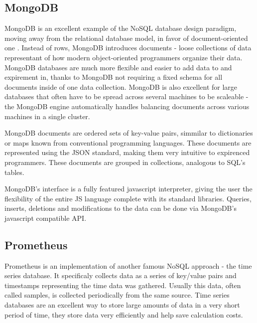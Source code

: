 \subsection{MongoDB}
\label{subsec:background:first_subsection}
MongoDB is an excellent example of the NoSQL database design paradigm, moving away from the relational database model, in favor of document-oriented one \citep{mongoDB}. Instead of rows, MongoDB introduces documents - loose collections of data representant of how modern object-oriented programmers organize their data. MongoDB databases are much more flexible and easier to add data to and expirement in, thanks to MongoDB not requiring a fixed schema for all documents inside of one data collection.
MongoDB is also excellent for large databases that often have to be spread across several machines to be scaleable - the MongoDB engine automatically handles balancing documents across various machines in a single cluster. 

MongoDB documents are ordered sets of key-value pairs, simmilar to dictionaries or maps known from conventional programming languages. These documents are represented using the JSON standard, making them very intuitive to expirenced programmers. These documents are grouped in collections, analogous to SQL's tables. 

MongoDB's interface is a fully featured javascript interpreter, giving the user the flexibility of the entire JS language complete with its standard libraries. Queries, inserts, deletions and modifications to the data can be done via MongoDB's javascript compatible API.

\subsection{Prometheus}
\label{subsec:background:second_section:second_subsection}
Prometheus is an implementation of another famous NoSQL approach - the time series database. It specificaly collects data as a series of key/value pairs and timestamps representing the time data was gathered. Usually this data, often called samples, is collected periodically from the same source. 
Time series databases are an excellent way to store large amounts of data in a very short period of time, they store data very efficiently and help save calculation costs.
